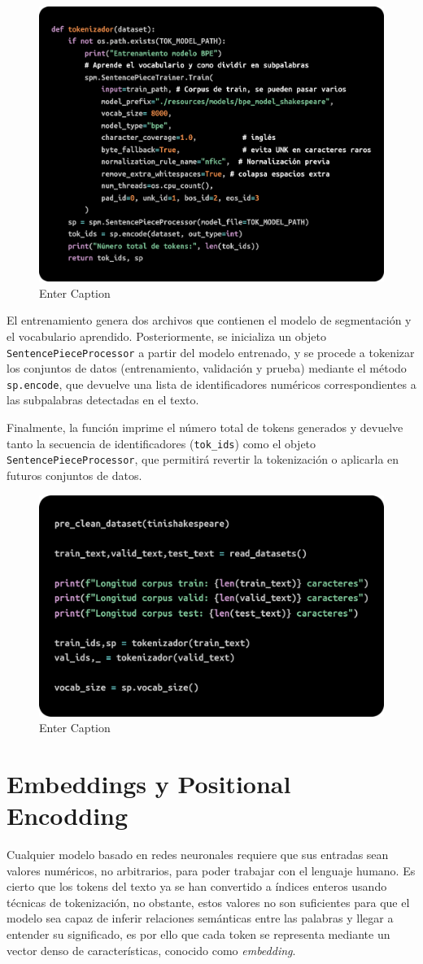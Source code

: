 \documentclass[11pt]{book}
\begin{document}
\begin{figure}[h]
    \centering
    \includegraphics[width=0.5\linewidth]{img/sentence_trainer.png}
    \caption{Enter Caption}
    \label{fig:placeholder3}
\end{figure}
 

El entrenamiento genera dos archivos que contienen el modelo de segmentación y el vocabulario aprendido. Posteriormente, se inicializa un objeto \texttt{SentencePieceProcessor} a partir del modelo entrenado, y se procede a tokenizar los conjuntos de datos (entrenamiento, validación y prueba) mediante el método \texttt{sp.encode}, que devuelve una lista de identificadores numéricos correspondientes a las subpalabras detectadas en el texto. 

Finalmente, la función imprime el número total de tokens generados y devuelve tanto la secuencia de identificadores (\texttt{tok\_ids}) como el objeto \texttt{SentencePieceProcessor}, que permitirá revertir la tokenización o aplicarla en futuros conjuntos de datos.

\begin{figure}[h]
    \centering
    \includegraphics[width=0.5\linewidth]{img/limpieza_tokeniz_train.png}
    \caption{Enter Caption}
    \label{fig:placeholder30}
\end{figure}


\section{Embeddings y Positional Encodding}
Cualquier modelo basado en redes neuronales requiere que sus entradas sean valores numéricos, no arbitrarios, para poder trabajar con el lenguaje humano. Es cierto que los tokens del texto ya se han convertido a índices enteros usando técnicas de tokenización, no obstante, estos valores no son suficientes para que el modelo sea capaz de inferir relaciones semánticas entre las palabras y llegar a entender su significado, es por ello que cada token se representa mediante un vector denso de características, conocido como \textit{embedding}.
\end{document}
